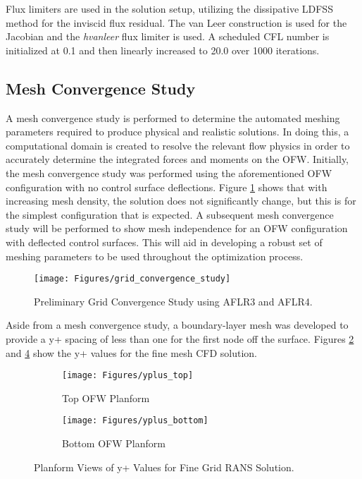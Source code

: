Flux limiters are used in the solution setup, utilizing the dissipative LDFSS method for the inviscid flux residual.
The van Leer construction is used for the Jacobian and the \textit{hvanleer} flux limiter is used.
A scheduled CFL number is initialized at 0.1 and then linearly increased to 20.0 over 1000 iterations.

\subsection{Mesh Convergence Study}

A mesh convergence study is performed to determine the automated meshing parameters required to produce physical and realistic solutions.
In doing this, a computational domain is created to resolve the relevant flow physics in order to accurately determine the integrated forces and moments on the OFW.
Initially, the mesh convergence study was performed using the aforementioned OFW configuration with no control surface deflections.
Figure \ref{fig:method:gridConvergence} shows that with increasing mesh density, the solution does not significantly change, but this is for the simplest configuration that is expected.
A subsequent mesh convergence study will be performed to show mesh independence for an OFW configuration with deflected control surfaces.
This will aid in developing a robust set of meshing parameters to be used throughout the optimization process.

\begin{figure}[h]
  \centering
  \texttt{[image: Figures/grid\_convergence\_study]}
  \caption{Preliminary Grid Convergence Study using AFLR3 and AFLR4.}
  \label{fig:method:gridConvergence}
\end{figure}

Aside from a mesh convergence study, a boundary-layer mesh was developed to provide a y+ spacing of less than one for the first node off the surface.
Figures \ref{fig:method:yplus_top} and \ref{fig:method:yplus_bottom} show the y+ values for the fine mesh CFD solution.

\begin{figure}[!ht]
  \begin{subfigure}[b]{0.49\textwidth}
    \texttt{[image: Figures/yplus\_top]}
    \caption{Top OFW Planform}
    \label{fig:method:yplus_top}
  \end{subfigure}
  \hfill
  \begin{subfigure}[b]{0.49\textwidth}
    \texttt{[image: Figures/yplus\_bottom]}
    \caption{Bottom OFW Planform}
    \label{fig:method:yplus_bottom}
  \end{subfigure}
  \caption{Planform Views of y+ Values for Fine Grid RANS Solution.}
\end{figure}
